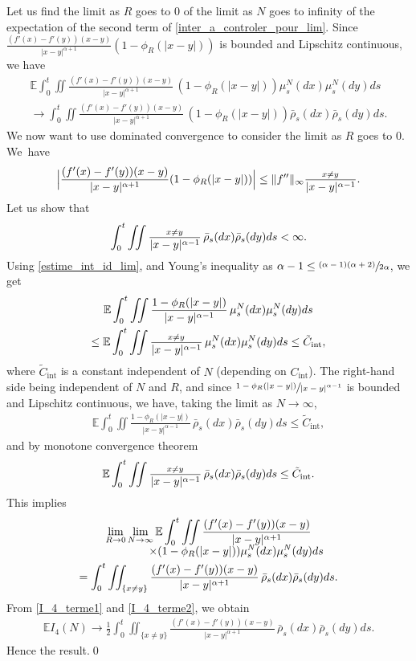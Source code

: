 \documentclass[11pt]{article}
\makeatletter
\DeclareRobustCommand{\mathbbm}[1]{\csname jepbb@#1\endcsname}
\let\mathds\mathbbm
\newcommand{\rint}{\mathrm{int}}
\theoremstyle{plain}
\theoremstyle{definition}
\makeatother
\begin{document}
Let us find the limit as $R$ goes to 0 of the limit as $N$ goes to infinity of the expectation of the second term of \eqref{inter_a_controler_pour_lim}. Since $\frac{(f'(x)-f'(y))(x-y)}{|x-y|^{\alpha+1}}(1-\phi_R(|x-y|))$ is bounded and Lipschitz continuous, we have
\begin{multline*}
\mathbb{E}\int_{0}^t\iint\frac{(f'(x)-f'(y))(x-y)}{|x-y|^{\alpha+1}}\,(1-\phi_R(|x-y|))\mu^N_s(dx)\mu^N_s(dy)ds\\
\to\int_{0}^t\iint\frac{(f'(x)-f'(y))(x-y)}{|x-y|^{\alpha+1}}\,(1-\phi_R(|x-y|))\bar{\rho}_s(dx)\bar{\rho}_s(dy)ds.
\end{multline*}
We now want to use dominated convergence to consider the limit as $R$ goes to $0$. We~have
\begin{align*}
\Bigl|\frac{(f'(x)-f'(y))(x-y)}{|x-y|^{\alpha+1}}(1-\phi_R(|x-y|))\Bigr|\leq \|f''\|_{\infty} \frac{\mathds{1}_{x\neq y}}{|x-y|^{\alpha-1}}.
\end{align*}
Let us show that
\[
\int_{0}^t\iint\frac{\mathds{1}_{x\neq y}}{|x-y|^{\alpha-1}}\,\bar{\rho}_s(dx)\bar{\rho}_s(dy)ds<\infty.
\]
Using \eqref{estime_int_id_lim}, and Young's inequality as ${\alpha-1\leq\sfrac{(\alpha-1)(\alpha+2)}{2\alpha}}$, we get
\begin{multline*}
\mathbb{E}\int_{0}^t\iint\frac{1-\phi_R(|x-y|)}{|x-y|^{\alpha-1}}\,\mu^N_s(dx)\mu^N_s(dy)ds\\
\leq \mathbb{E}\int_{0}^t\iint\frac{\mathds{1}_{x\neq y}}{|x-y|^{\alpha-1}}\,\mu^N_s(dx)\mu^N_s(dy)ds\leq \tilde{C}_{\rint},
\end{multline*}
where $\tilde{C}_{\rint}$ is a constant independent of $N$ (depending on $C_{\rint}$). The right-hand side being independent of $N$ and $R$, and since $\sfrac{1-\phi_R(|x-y|)}{|x-y|^{\alpha-1}}$ is bounded and Lipschitz continuous, we have, taking the limit as $N\to\infty$,
\begin{align*}
\mathbb{E}\int_{0}^t\iint\frac{1-\phi_R(|x-y|)}{|x-y|^{\alpha-1}}\,\bar{\rho}_s(dx)\bar{\rho}_s(dy)ds\leq \tilde{C}_{\rint},
\end{align*}
and by monotone convergence theorem
\begin{align*}
\mathbb{E}\int_{0}^t\iint\frac{\mathds{1}_{x\neq y}}{|x-y|^{\alpha-1}}\,\bar{\rho}_s(dx)\bar{\rho}_s(dy)ds\leq \tilde{C}_{\rint}.
\end{align*}
This implies
\begin{multline}
\lim_{R\to 0}\lim_{N\to \infty}\mathbb{E}\int_{0}^t\iint\frac{(f'(x)-f'(y))(x-y)}{|x-y|^{\alpha+1}}\\[-5pt]
\shoveright{\times(1-\phi_R(|x-y|))\mu^N_s(dx)\mu^N_s(dy)ds\hphantom{.}}\\
=\int_{0}^t\iint_{\{x\neq y\}}\frac{(f'(x)-f'(y))(x-y)}{|x-y|^{\alpha+1}}\,\bar{\rho}_s(dx)\bar{\rho}_s(dy)ds\label{I_4_terme2}.
\end{multline}
From \eqref{I_4_terme1} and \eqref{I_4_terme2}, we obtain
\begin{align*}
\mathbb{E}I_4(N)\to\frac{1}{2}\int_{0}^t\iint_{\{x\neq y\}}\frac{(f'(x)-f'(y))(x-y)}{|x-y|^{\alpha+1}}\,\bar{\rho}_s(dx)\bar{\rho}_s(dy)ds.
\end{align*}
Hence the result.\qed
\end{document}
